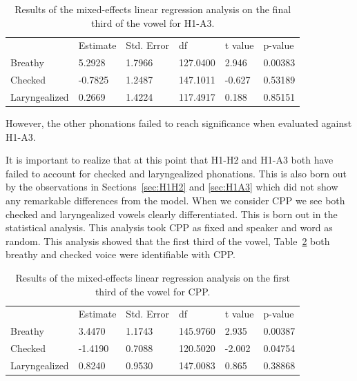 \documentclass[12pt, letterpaper]{article}
\providecommand{\lsptoprule}{\midrule\toprule}
\providecommand{\lspbottomrule}{\bottomrule\midrule}
\begin{document}
\begin{table}[!h]
	\centering
	\caption{Results of the mixed-effects linear regression analysis on the final third of the vowel for H1-A3. }
	\label{tab:H1A3_Third}
	 \begin{tabular}{llllll}
	  \lsptoprule
						&  Estimate  & Std. Error & df & t value & p-value \\
	  	Breathy   		&  5.2928   &  1.7966 & 127.0400 &  2.946 & 0.00383 \\
		Checked    		& -0.7825   &  1.2487 & 147.1011 & -0.627 & 0.53189 \\
		Laryngealized	& 0.2669    &  1.4224 & 117.4917 &  0.188 & 0.85151 \\
	  \lspbottomrule
	 \end{tabular}
\end{table}

However, the other phonations failed to reach significance when evaluated against H1-A3.

It is important to realize that at this point that H1-H2 and H1-A3 both have failed to account for checked and laryngealized phonations. This is also born out by the observations in Sections~\ref{sec:H1H2} and \ref{sec:H1A3} which did not show any remarkable differences from the model. When we consider CPP we see both checked and laryngealized vowels clearly differentiated. This is born out in the statistical analysis. This analysis took CPP as fixed and speaker and word as random. This analysis showed that the first third of the vowel, Table~\ref{tab:CPP_First} both breathy and checked voice were identifiable with CPP. 


\begin{table}[!h]
	\centering
	\caption{Results of the mixed-effects linear regression analysis on the first third of the vowel for CPP. }
	\label{tab:CPP_First}
	 \begin{tabular}{llllll}
	  \lsptoprule
						&  Estimate  & Std. Error & df & t value & p-value \\
	  	Breathy   		&  3.4470   &  1.1743 & 145.9760 &  2.935 & 0.00387 \\
		Checked    		& -1.4190   &  0.7088 & 120.5020 & -2.002 & 0.04754 \\
		Laryngealized	&  0.8240   &  0.9530 & 147.0083 &  0.865 & 0.38868 \\
	  \lspbottomrule
	 \end{tabular}
\end{table}
\end{document}
